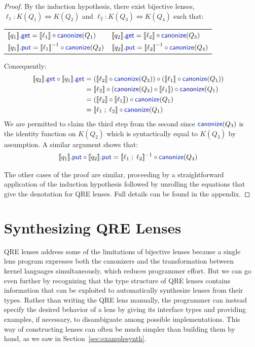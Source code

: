 \documentclass[acmsmall,screen]{acmart}
\newcommand{\kw}[1]{\textcolor{dkblue}{\ensuremath{\mathsf{#1}}}}
\newcommand{\canonize}{\ensuremath{\kw{canonize}}}
\newcommand{\get}{\ensuremath{\kw{get}}}
\newcommand{\lput}{\ensuremath{\kw{put}}}
\begin{document}
\begin{proof}
By the induction hypothesis, there exist bijective lenses,
$\ell_1 : K(Q_1) \Leftrightarrow K(Q_2)$ and $\ell_2 : K(Q_3) \Leftrightarrow
K(Q_4)$ such that:
\begin{center}
\begin{tabular}{l l}
$\llbracket q_1 \rrbracket.\get = \llbracket \ell_1 \rrbracket \circ
\canonize(Q_1)$ & $\llbracket q_2 \rrbracket.\get = \llbracket \ell_2
\rrbracket \circ \canonize(Q_3)$ \\
$\llbracket q_1 \rrbracket.\lput = {\llbracket \ell_1 \rrbracket}^{-1} \circ
\canonize(Q_2)$ & $\llbracket q_2 \rrbracket.\lput = {\llbracket \ell_2
\rrbracket}^{-1} \circ \canonize(Q_4)$
\end{tabular}
\end{center}
%
Consequently:
\begin{align*}
\llbracket q_2 \rrbracket.\get \circ \llbracket q_1 \rrbracket.\get &=
(\llbracket \ell_2 \rrbracket \circ \canonize(Q_3)) \circ (\llbracket \ell_1
\rrbracket \circ \canonize(Q_1))\\
&= \llbracket \ell_2 \rrbracket \circ (\canonize(Q_3) \circ \llbracket \ell_1
\rrbracket) \circ \canonize(Q_1)\\
&= (\llbracket \ell_2 \rrbracket \circ \llbracket \ell_1 \rrbracket) \circ
\canonize(Q_1)\\
&= \llbracket \ell_1 \; ; \; \ell_2 \rrbracket \circ \canonize(Q_1)
\end{align*}
We are permitted to claim the third step from the second since
$\canonize(Q_3)$ is the identity function on $K(Q_2)$ which is
syntactically equal to $K(Q_3)$ by assumption. A similar argument shows that:
$$\llbracket q_1 \rrbracket.\lput \circ \llbracket q_2 \rrbracket.\lput =
\llbracket \ell_1 \; ; \; \ell_2 \rrbracket^{-1} \circ
\canonize(Q_4)$$

The other cases of the proof are similar, proceeding by a straightforward
application of the induction hypothesis followed by unrolling the equations
that give the denotation for QRE lenses.  Full details can be found in the
appendix.
\end{proof}

\section{Synthesizing QRE Lenses}
\label{synth}

QRE lenses address some of the limitations of bijective lenses because a single
lens program expresses both the canonizers and the transformation between kernel
languages simultaneously, which reduces programmer effort.  But we can go even
further by recognizing that the type structure of QRE lenses contains
information that can be exploited to automatically synthesize lenses from their
types.  Rather than writing the QRE lens manually, the programmer can instead
specify the desired behavior of a lens by giving its interface types and
providing examples, if necessary, to disambiguate among possible
implementations.  This way of constructing lenses can often be much simpler
than building them by hand, as we saw in Section~\ref{sec:examplesynth}.
\end{document}
